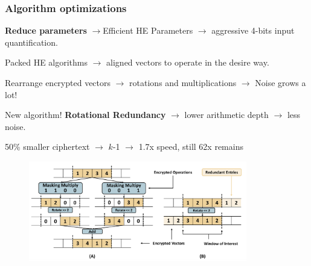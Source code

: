 \documentclass[10pt]{beamer}
\begin{document}
\begin{frame}
\frametitle{Algorithm optimizations}
    \textbf{Reduce parameters} $\rightarrow$Efficient HE Parameters $\rightarrow$ aggressive 4-bits input quantification.
    \vspace{-0.2cm}

    \pause
Packed HE algorithms $\rightarrow$  aligned vectors to operate in the desire way.
    \vspace{-0.2cm}

Rearrange encrypted vectors $\rightarrow$ rotations and multiplications  $\rightarrow$ Noise grows a lot!

    \pause
    \vspace{-0.2cm}
    New algorithm! \textbf{Rotational Redundancy} $\rightarrow$ lower arithmetic depth $\rightarrow$ less noise.

    \vspace{-0.2cm}
    50\% smaller ciphertext $\rightarrow$ $k$-1 $\rightarrow$ 1.7x speed, still 62x remains
    \vspace{-0.2cm}
\begin{figure}
    \includegraphics[width=0.85\textwidth]{rotation.png}
\end{figure}
\end{frame}



%
%
%
%
%
%
%
%
\end{document}

